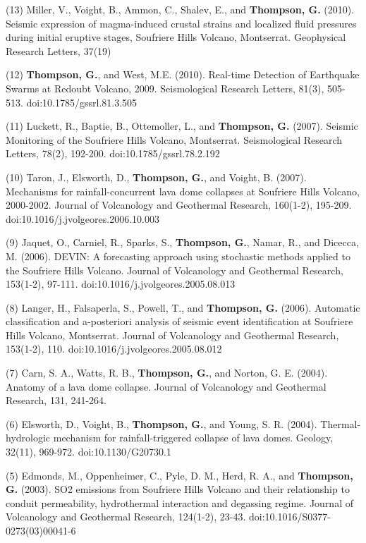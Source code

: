 \documentclass[margin,line]{res}
\begin{document}
\begin{resume}
	(13) Miller, V., Voight, B., Ammon, C., Shalev, E., and {\bf Thompson, G.} (2010). Seismic expression of magma-induced crustal strains and localized fluid pressures during initial eruptive stages, Soufriere Hills Volcano, Montserrat. Geophysical Research Letters, 37(19) 

	(12) {\bf Thompson, G.}, and West, M.E. (2010). Real-time Detection of Earthquake Swarms at Redoubt Volcano, 2009. Seismological Research Letters, 81(3), 505-513. doi:10.1785/gssrl.81.3.505

	(11) Luckett, R., Baptie, B., Ottemoller, L., and {\bf Thompson, G.} (2007). Seismic Monitoring of the Soufriere Hills Volcano, Montserrat. Seismological Research Letters, 78(2), 192-200. doi:10.1785/gssrl.78.2.192

	(10) Taron, J., Elsworth, D., {\bf Thompson, G.}, and Voight, B. (2007). Mechanisms for rainfall-concurrent lava dome collapses at Soufriere Hills Volcano, 2000-2002. Journal of Volcanology and Geothermal Research, 160(1-2), 195-209. doi:10.1016/j.jvolgeores.2006.10.003

	(9) Jaquet, O., Carniel, R., Sparks, S., {\bf Thompson, G.}, Namar, R., and Dicecca, M. (2006). DEVIN: A forecasting approach using stochastic methods applied to the Soufriere Hills Volcano. Journal of Volcanology and Geothermal Research, 153(1-2), 97-111. doi:10.1016/j.jvolgeores.2005.08.013 

	(8) Langer, H., Falsaperla, S., Powell, T., and {\bf Thompson, G.} (2006). Automatic classification and a-posteriori analysis of seismic event identification at Soufriere Hills Volcano, Montserrat. Journal of Volcanology and Geothermal Research, 153(1-2), 110. doi:10.1016/j.jvolgeores.2005.08.012

	(7) Carn, S. A., Watts, R. B., {\bf Thompson, G.}, and Norton, G. E. (2004). Anatomy of a lava dome collapse. Journal of Volcanology and Geothermal Research, 131, 241-264.

	(6) Elsworth, D., Voight, B., {\bf Thompson, G.}, and Young, S. R. (2004). Thermal-hydrologic mechanism for rainfall-triggered collapse of lava domes. Geology, 32(11), 969-972. doi:10.1130/G20730.1

	(5) Edmonds, M., Oppenheimer, C., Pyle, D. M., Herd, R. A., and {\bf Thompson, G.} (2003). SO2 emissions from Soufriere Hills Volcano and their relationship to conduit permeability, hydrothermal interaction and degassing regime. Journal of Volcanology and Geothermal Research, 124(1-2), 23-43. doi:10.1016/S0377-0273(03)00041-6


\end{resume}
\end{document}
